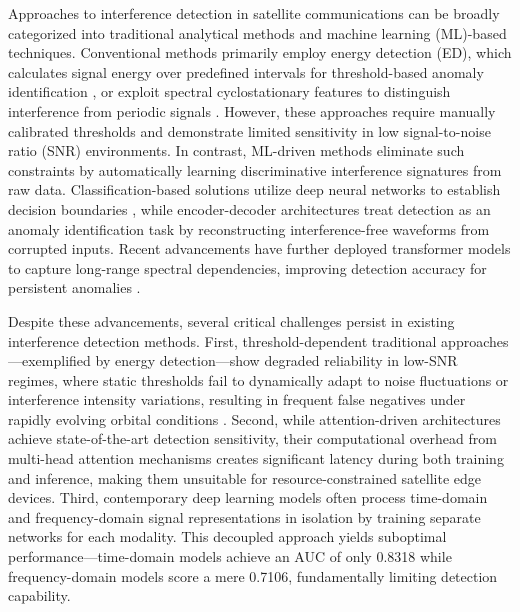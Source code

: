 \documentclass[conference]{IEEEtran}
\begin{document}
Approaches to interference detection in satellite communications can be broadly categorized into traditional analytical methods and machine learning (ML)-based techniques. Conventional methods primarily employ energy detection (ED), which calculates signal energy over predefined intervals for threshold-based anomaly identification \cite{kay2009fundamentals}, or exploit spectral cyclostationary features to distinguish interference from periodic signals \cite{experimentalCyclostationary}. However, these approaches require manually calibrated thresholds and demonstrate limited sensitivity in low signal-to-noise ratio (SNR) environments. In contrast, ML-driven methods eliminate such constraints by automatically learning discriminative interference signatures from raw data. Classification-based solutions utilize deep neural networks to establish decision boundaries \cite{pellacoSpectrumPredictionInterference2019}, while encoder-decoder architectures treat detection as an anomaly identification task by reconstructing interference-free waveforms from corrupted inputs. Recent advancements have further deployed transformer models to capture long-range spectral dependencies, improving detection accuracy for persistent anomalies \cite{saifaldawlaGenAIBasedModelsNGSO2024}.

Despite these advancements, several critical challenges persist in existing interference detection methods. First, threshold-dependent traditional approaches—exemplified by energy detection—show degraded reliability in low-SNR regimes, where static thresholds fail to dynamically adapt to noise fluctuations or interference intensity variations, resulting in frequent false negatives under rapidly evolving orbital conditions \cite{saifaldawlaGenAIBasedModelsNGSO2024}. Second, while attention-driven architectures achieve state-of-the-art detection sensitivity, their computational overhead from multi-head attention mechanisms creates significant latency during both training and inference, making them unsuitable for resource-constrained satellite edge devices. Third, contemporary deep learning models often process time-domain and frequency-domain signal representations in isolation by training separate networks for each modality. This decoupled approach yields suboptimal performance—time-domain models achieve an AUC of only 0.8318 while frequency-domain models score a mere 0.7106, fundamentally limiting detection capability.
\end{document}
